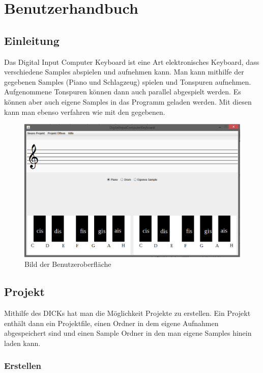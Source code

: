 \section{Benutzerhandbuch}
\subsection{Einleitung}

Das Digital Input Computer Keyboard ist eine Art elektronisches Keyboard, dass verschiedene Samples abspielen und aufnehmen kann. Man kann mithilfe der gegebenen Samples (Piano und Schlagzeug) spielen und Tonspuren aufnehmen. Aufgenommene Tonspuren können dann auch parallel abgespielt werden. Es können aber auch eigene Samples in das Programm geladen werden. Mit diesen kann man ebenso verfahren wie mit den gegebenen.

\begin{figure}[hbtp]
\centering
\includegraphics[scale=0.4]{Bilder/Projektbild1.PNG} 
\caption{Bild der Benutzeroberfläche}
\end{figure}


\subsection{Projekt}

Mithilfe des DICKs hat man die Möglichkeit Projekte zu erstellen. Ein Projekt enthält dann ein Projektfile, einen Ordner in dem eigene Aufnahmen abgespeichert sind und einen Sample Ordner in den man eigene Samples hinein laden kann.

\newpage


\subsubsection{Erstellen}

